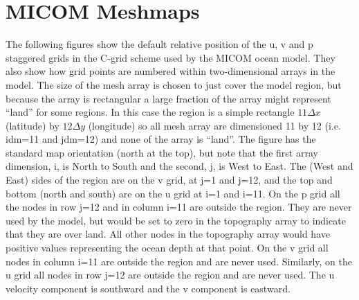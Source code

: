


\section*{MICOM Meshmaps}

The following figures show the default relative position of the u, v and p 
staggered grids in the C-grid scheme used by the MICOM ocean model.  
They also show how grid points are numbered within two-dimensional arrays 
in the model.  
The size of the mesh array is chosen to just cover the model region, but 
because the array is rectangular a large fraction of the array might 
represent ``land'' for some regions.
In this case the region is a simple rectangle  $11 \Delta x$ (latitude) 
by $12 \Delta y$ (longitude) so all mesh array are dimensioned 11 by 12 
(i.e. idm=11 and jdm=12) and none of the array is ``land''.   
The figure has the standard map orientation (north at the top), but 
note that the first array dimension, i, is North to South and the second, 
j, is West to East.
The (West and East) sides of the region are on the v grid, at j=1 and 
j=12, and the top and bottom (north and south) are on the u grid at i=1 
and i=11.  
On the p grid all the nodes in row j=12 and in column i=11 are outside 
the region.  They are never used by the model, but would be set to zero 
in the topography array to indicate that they are over land.  
All other nodes in the topography array would have positive values 
representing the ocean depth at that point.
On the v grid all nodes in column i=11 are outside the region and are 
never used.  
Similarly, on the u grid all nodes in row j=12 are outside the region and 
are never used.
The u velocity component is southward and the v component is eastward.

